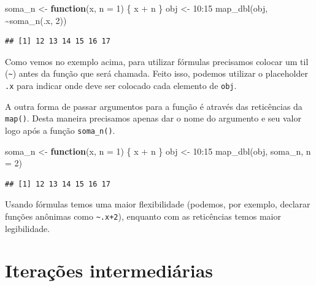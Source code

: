 \documentclass[
]{book}
\newenvironment{Shaded}{\begin{snugshade}}{\end{snugshade}}
\newcommand{\AttributeTok}[1]{\textcolor[rgb]{0.77,0.63,0.00}{#1}}
\newcommand{\ControlFlowTok}[1]{\textcolor[rgb]{0.13,0.29,0.53}{\textbf{#1}}}
\newcommand{\DecValTok}[1]{\textcolor[rgb]{0.00,0.00,0.81}{#1}}
\newcommand{\FunctionTok}[1]{\textcolor[rgb]{0.00,0.00,0.00}{#1}}
\newcommand{\NormalTok}[1]{#1}
\newcommand{\OtherTok}[1]{\textcolor[rgb]{0.56,0.35,0.01}{#1}}
\newcommand{\SpecialCharTok}[1]{\textcolor[rgb]{0.00,0.00,0.00}{#1}}
\begin{document}
\begin{Shaded}
\begin{Highlighting}[]
\NormalTok{soma\_n }\OtherTok{\textless{}{-}} \ControlFlowTok{function}\NormalTok{(x, }\AttributeTok{n =} \DecValTok{1}\NormalTok{) \{ x }\SpecialCharTok{+}\NormalTok{ n \}}
\NormalTok{obj }\OtherTok{\textless{}{-}} \DecValTok{10}\SpecialCharTok{:}\DecValTok{15}
\FunctionTok{map\_dbl}\NormalTok{(obj, }\SpecialCharTok{\textasciitilde{}}\FunctionTok{soma\_n}\NormalTok{(.x, }\DecValTok{2}\NormalTok{))}
\end{Highlighting}
\end{Shaded}

\begin{verbatim}
## [1] 12 13 14 15 16 17
\end{verbatim}

Como vemos no exemplo acima, para utilizar fórmulas precisamos colocar um til
(\texttt{\textasciitilde{}}) antes da função que será chamada. Feito isso, podemos utilizar o
placeholder \texttt{.x} para indicar onde deve ser colocado cada elemento de \texttt{obj}.

A outra forma de passar argumentos para a função é através das reticências da
\texttt{map()}. Desta maneira precisamos apenas dar o nome do argumento e seu valor
logo após a função \texttt{soma\_n()}.

\begin{Shaded}
\begin{Highlighting}[]
\NormalTok{soma\_n }\OtherTok{\textless{}{-}} \ControlFlowTok{function}\NormalTok{(x, }\AttributeTok{n =} \DecValTok{1}\NormalTok{) \{ x }\SpecialCharTok{+}\NormalTok{ n \}}
\NormalTok{obj }\OtherTok{\textless{}{-}} \DecValTok{10}\SpecialCharTok{:}\DecValTok{15}
\FunctionTok{map\_dbl}\NormalTok{(obj, soma\_n, }\AttributeTok{n =} \DecValTok{2}\NormalTok{)}
\end{Highlighting}
\end{Shaded}

\begin{verbatim}
## [1] 12 13 14 15 16 17
\end{verbatim}

Usando fórmulas temos uma maior flexibilidade (podemos, por exemplo, declarar
funções anônimas como \texttt{\textasciitilde{}.x+2}), enquanto com as reticências temos maior
legibilidade.

\hypertarget{iterauxe7uxf5es-intermediuxe1rias}{%
\section{Iterações intermediárias}\label{iterauxe7uxf5es-intermediuxe1rias}}
\end{document}
